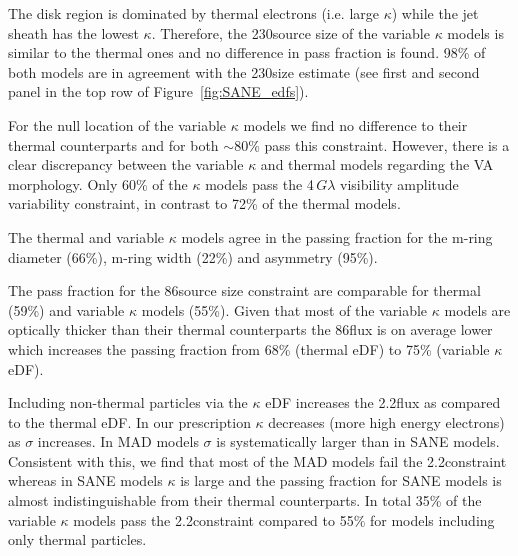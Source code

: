 
The disk region is dominated by thermal electrons (i.e. large $\kappa$) while the jet sheath has the lowest $\kappa$.
Therefore, the 230\GHz source size of the variable $\kappa$ models is similar to the thermal ones and no difference in pass fraction is found.
98\% of both models are in agreement with the 230\GHz size estimate (see first and second panel in the top row of Figure~\ref{fig:SANE_edfs}).


For the null location of the variable $\kappa$ models we find no difference to their thermal counterparts and for both $\sim$80\% pass this constraint.
However, there is a clear discrepancy between the variable $\kappa$ and thermal models regarding the VA morphology.
Only 60\% of the $\kappa$ models pass the 4\,$G\lambda$ visibility amplitude variability constraint, in contrast to 72\% of the thermal models.


The thermal and variable $\kappa$ models agree in the passing fraction for the m-ring diameter (66\%), m-ring width (22\%) and asymmetry (95\%).


The pass fraction for the 86\GHz source size constraint are comparable for thermal (59\%) and variable $\kappa$ models (55\%).
Given that most of the variable $\kappa$ models are optically thicker than their thermal counterparts the 86\GHz flux is on average lower which increases the passing fraction from 68\% (thermal eDF) to 75\% (variable $\kappa$ eDF).


Including non-thermal particles via the $\kappa$ eDF increases the 2.2\um flux as compared to the thermal eDF.  In our prescription $\kappa$ decreases (more high energy electrons) as $\sigma$ increases.  In MAD models $\sigma$ is systematically larger than in SANE models.  Consistent with this, we find that most of the MAD models fail the 2.2\um constraint whereas in SANE models $\kappa$ is large and the passing fraction for SANE models is almost indistinguishable from their thermal counterparts.
In total 35\% of the variable $\kappa$ models pass the 2.2\um constraint compared to 55\% for models including only thermal particles.

